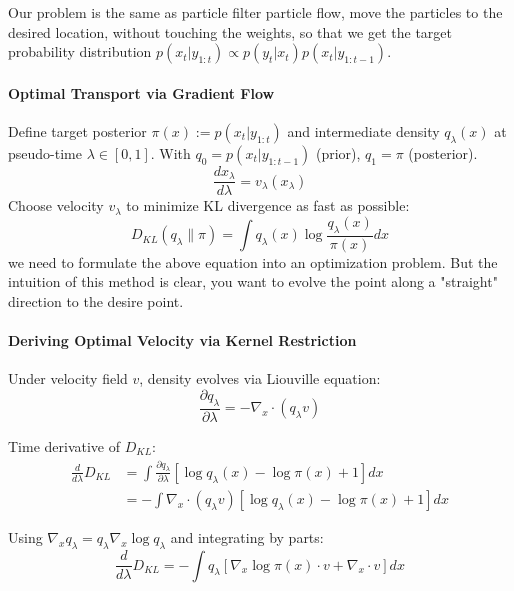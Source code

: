 \documentclass{article}
\begin{document}
Our problem is the same as particle filter particle flow, move the particles to the desired location, without touching the weights, so that we get the target probability distribution $p(x_t | y_{1:t}) \propto p(y_t | x_t) p(x_t | y_{1:t-1})$. 

\paragraph{Optimal Transport via Gradient Flow}

Define target posterior $\pi(x) := p(x_t | y_{1:t})$ and intermediate density $q_\lambda(x)$ at pseudo-time $\lambda \in [0,1]$. With $q_0 = p(x_t | y_{1:t-1})$ (prior), $q_1 = \pi$ (posterior).
\begin{equation}
\frac{dx_\lambda}{d\lambda} = v_\lambda(x_\lambda)
\end{equation}
Choose velocity $v_\lambda$ to minimize KL divergence as fast as possible:
\begin{equation}
D_{KL}(q_\lambda \| \pi) = \int q_\lambda(x) \log \frac{q_\lambda(x)}{\pi(x)} dx
\end{equation}
we need to formulate the above equation into an optimization problem. But the intuition of this method is clear, you want to evolve the point along a "straight" direction to the desire point. 


\paragraph{Deriving Optimal Velocity via Kernel Restriction}

Under velocity field $v$, density evolves via Liouville equation:
\begin{equation}
\frac{\partial q_\lambda}{\partial \lambda} = -\nabla_x \cdot (q_\lambda v)
\end{equation}

Time derivative of $D_{KL}$:
\begin{align}
\frac{d}{d\lambda} D_{KL} &= \int \frac{\partial q_\lambda}{\partial \lambda} \left[\log q_\lambda(x) - \log \pi(x) + 1\right] dx \\
&= -\int \nabla_x \cdot (q_\lambda v) \left[\log q_\lambda(x) - \log \pi(x) + 1\right] dx
\end{align}

Using $\nabla_x q_\lambda = q_\lambda \nabla_x \log q_\lambda$ and integrating by parts:
\begin{equation}
\frac{d}{d\lambda} D_{KL} = -\int q_\lambda \left[\nabla_x \log \pi(x) \cdot v + \nabla_x \cdot v\right] dx 
\end{equation}
\end{document}
